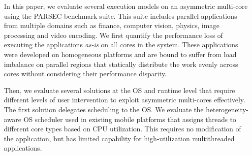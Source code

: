 

In this paper, we evaluate several execution models on an asymmetric multi-core
using the PARSEC benchmark suite. This suite includes parallel applications from multiple domains 
such as finance, computer vision, physics, image processing and video encoding. We first quantify 
the performance loss of executing the applications \textit{as-is} on all cores 
in the system. These applications were developed on homogeneous platforms and are bound to suffer from
load imbalance on parallel regions that statically distribute the work
evenly across cores without considering their performance disparity.

Then, we evaluate several solutions at the OS and runtime level that require different
levels of user intervention to exploit asymmetric multi-cores effectively. The first
solution delegates scheduling to the OS. We evaluate the heterogeneity-aware
OS scheduler used in existing mobile platforms that assigns threads to different
core types based on CPU utilization. This requires no modification of the
application, but has limited capability for high-utilization multithreaded applications.



